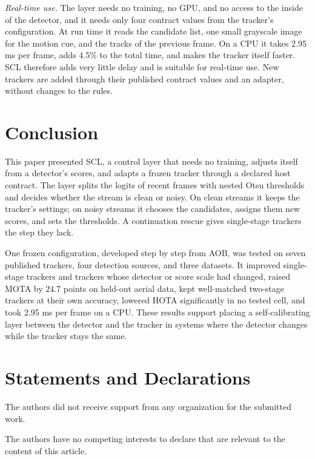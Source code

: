 \documentclass[pdflatex,referee,sn-mathphys-num]{sn-jnl}
\newcommand{\scl}{SCL}
\newcommand{\aob}{AOB}
\begin{document}
\emph{Real-time use.} The layer needs no training, no GPU, and no access to
the inside of the detector, and it needs only four contract values from the
tracker's configuration. At run time it reads the candidate list, one small
grayscale image for the motion cue, and the tracks of the previous frame. On
a CPU it takes 2.95 ms per frame, adds 4.5\% to the total time, and makes the
tracker itself faster. \scl{} therefore adds very little delay and is
suitable for real-time use. New trackers are added through their published
contract values and an adapter, without changes to the rules.
\section{Conclusion}\label{sec:conclusion}

This paper presented \scl{}, a control layer that needs no training, adjusts
itself from a detector's scores, and adapts a frozen tracker through a
declared host contract. The layer splits the logits of recent frames with
nested Otsu thresholds and decides whether the stream is clean or noisy. On
clean streams it keeps the tracker's settings; on noisy streams it chooses
the candidates, assigns them new scores, and sets the thresholds. A
continuation rescue gives single-stage trackers the step they lack.

One frozen configuration, developed step by step from \aob{}, was tested on
seven published trackers, four detection sources, and three datasets. It
improved single-stage trackers and trackers whose detector or score scale had
changed, raised MOTA by 24.7 points on held-out aerial data, kept well-matched
two-stage trackers at their own accuracy, lowered HOTA significantly in no
tested cell, and took 2.95 ms per frame on a CPU. These results support placing a self-calibrating
layer between the detector and the tracker in systems where the detector
changes while the tracker stays the same.

\backmatter

\section*{Statements and Declarations}

The authors did not receive support from any organization for the submitted work.

The authors have no competing interests to declare that are relevant to the content of this
article.
\end{document}
